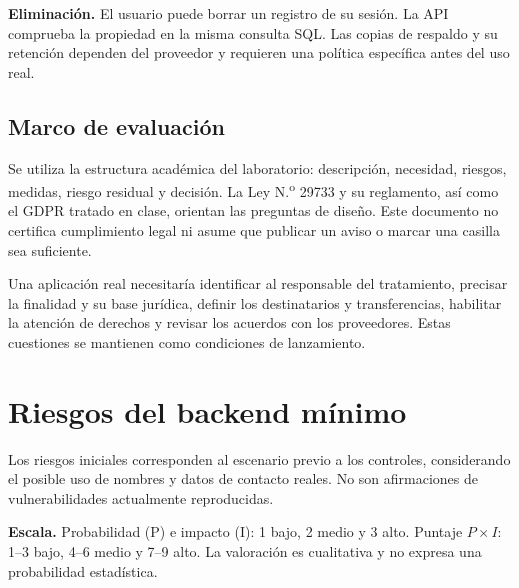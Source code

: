 \documentclass[11pt,a4paper]{article}
\begin{document}
\textbf{Eliminación.} El usuario puede borrar un registro de su sesión. La API comprueba la propiedad en la misma consulta SQL. Las copias de respaldo y su retención dependen del proveedor y requieren una política específica antes del uso real.

\subsection{Marco de evaluación}
Se utiliza la estructura académica del laboratorio: descripción, necesidad, riesgos, medidas, riesgo residual y decisión. La Ley N.\textsuperscript{o} 29733 y su reglamento, así como el GDPR tratado en clase, orientan las preguntas de diseño. Este documento no certifica cumplimiento legal ni asume que publicar un aviso o marcar una casilla sea suficiente.

Una aplicación real necesitaría identificar al responsable del tratamiento, precisar la finalidad y su base jurídica, definir los destinatarios y transferencias, habilitar la atención de derechos y revisar los acuerdos con los proveedores. Estas cuestiones se mantienen como condiciones de lanzamiento.

\newpage
\section{Riesgos del backend mínimo}
Los riesgos iniciales corresponden al escenario previo a los controles, considerando el posible uso de nombres y datos de contacto reales. No son afirmaciones de vulnerabilidades actualmente reproducidas.

\textbf{Escala.} Probabilidad (P) e impacto (I): 1 bajo, 2 medio y 3 alto. Puntaje $P\times I$: 1--3 bajo, 4--6 medio y 7--9 alto. La valoración es cualitativa y no expresa una probabilidad estadística.
\end{document}
